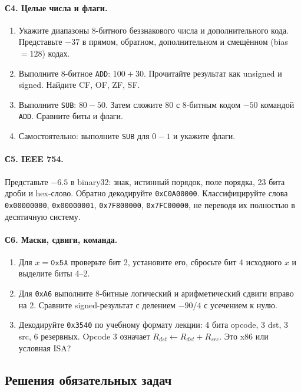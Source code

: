 \paragraph{С4. Целые числа и флаги.}
\begin{enumerate}
    \item Укажите диапазоны 8-битного беззнакового числа и дополнительного кода.
    Представьте $-37$ в прямом, обратном, дополнительном и смещённом
    (bias $=128$) кодах.
    \item Выполните 8-битное \texttt{ADD}: $100+30$.
    Прочитайте результат как unsigned и signed. Найдите CF, OF, ZF, SF.
    \item Выполните \texttt{SUB}: $80-50$. Затем сложите $80$ с 8-битным
    кодом $-50$ командой \texttt{ADD}. Сравните биты и флаги.
    \item Самостоятельно: выполните \texttt{SUB} для $0-1$ и укажите флаги.
\end{enumerate}

\paragraph{С5. IEEE 754.}
Представьте $-6.5$ в binary32: знак, истинный порядок, поле порядка,
23 бита дроби и hex-слово. Обратно декодируйте \texttt{0xC0A00000}.
Классифицируйте слова \texttt{0x00000000}, \texttt{0x00000001},
\texttt{0x7F800000}, \texttt{0x7FC00000}, не переводя их полностью в десятичную систему.

\paragraph{С6. Маски, сдвиги, команда.}
\begin{enumerate}
    \item Для $x=\texttt{0x5A}$ проверьте бит 2, установите его,
    сбросьте бит 4 исходного $x$ и выделите биты 4--2.
    \item Для \texttt{0xA6} выполните 8-битные логический и арифметический
    сдвиги вправо на 2. Сравните signed-результат с делением $-90/4$
    с усечением к нулю.
    \item Декодируйте \texttt{0x3540} по учебному формату лекции:
    4 бита opcode, 3 dst, 3 src, 6 резервных. Opcode 3 означает
    $R_{dst}\gets R_{dst}+R_{src}$. Это x86 или условная ISA?
\end{enumerate}

\subsection*{Решения обязательных задач}
